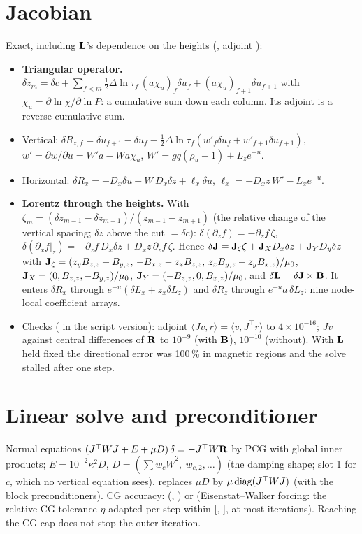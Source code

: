 \section{Jacobian}
Exact, including $\mathbf L$'s dependence on the heights (, adjoint ):
\begin{itemize}
\item \textbf{Triangular operator.} $\delta z_m=\delta c+\sum_{f<m}\tfrac12\Delta\ln\tau_f\,(a\chi_u)_f\delta u_f+(a\chi_u)_{f+1}\delta u_{f+1}$ with
$\chi_u=\partial\ln\chi/\partial\ln P$: a cumulative sum down each column. Its adjoint is a reverse cumulative sum.
\item Vertical: $\delta R_{z,f}=\delta u_{f+1}-\delta u_f-\tfrac12\Delta\ln\tau_f(w'_f\delta u_f+w'_{f+1}\delta u_{f+1})$,
$w'=\partial w/\partial u=W'a-Wa\chi_u$, $W'=gq(\rho_u-1)+L_ze^{-u}$.
\item Horizontal: $\delta R_x=-D_x\delta u-W\,D_x\delta z+\ell_x\delta u$, $\ell_x=-D_xz\,W'-L_xe^{-u}$.
\item \textbf{Lorentz through the heights.} With $\zeta_m=(\delta z_{m-1}-\delta z_{m+1})/(z_{m-1}-z_{m+1})$ (the relative change of
the vertical spacing; $\delta z$ above the cut $=\delta c$): $\delta(\partial_zf)=-\partial_zf\,\zeta$,
$\delta(\partial_xf|_z)=-\partial_zf\,D_x\delta z+D_xz\,\partial_zf\,\zeta$. Hence
$\delta\mathbf J=\mathbf J_\zeta\zeta+\mathbf J_XD_x\delta z+\mathbf J_YD_y\delta z$ with
$\mathbf J_\zeta=(z_yB_{z,z}+B_{y,z},\,-B_{x,z}-z_xB_{z,z},\,z_xB_{y,z}-z_yB_{x,z})/\mu_0$, $\mathbf J_X=(0,B_{z,z},-B_{y,z})/\mu_0$,
$\mathbf J_Y=(-B_{z,z},0,B_{x,z})/\mu_0$, and $\delta\mathbf L=\delta\mathbf J\times\mathbf B$. It enters $\delta R_x$ through $e^{-u}(\delta L_x+z_x\delta L_z)$
and $\delta R_z$ through $e^{-u}a\,\delta L_z$: nine node-local coefficient arrays.
\item Checks ( in the script version): adjoint $\langle Jv,r\rangle=\langle v,J^\top r\rangle$ to $4\times10^{-16}$;
$Jv$ against central differences of $\mathbf R$ to $10^{-9}$ (with $\mathbf B$), $10^{-10}$ (without). With $\mathbf L$ held fixed the
directional error was 100\,\% in magnetic regions and the solve stalled after one step.
\end{itemize}

\section{Linear solve and preconditioner}\label{sec:prec}
Normal equations $(J^\top WJ+E+\mu D)\,\delta=-J^\top W\mathbf R$ by PCG with global inner products; $E=10^{-2}\kappa^2D$,
$D=(\sum w_c\bar W^2,\ w_{c,2},\dots)$ (the damping shape; slot 1 for $c$, which no vertical equation sees).  replaces $\mu D$ by $\mu\,{\rm diag}(J^\top WJ)$ (with the block preconditioners). CG accuracy:  (, ) or  (Eisenstat--Walker forcing: the relative CG tolerance $\eta$ adapted per
step within [, ], at most  iterations). Reaching the CG cap does not stop
the outer iteration.


